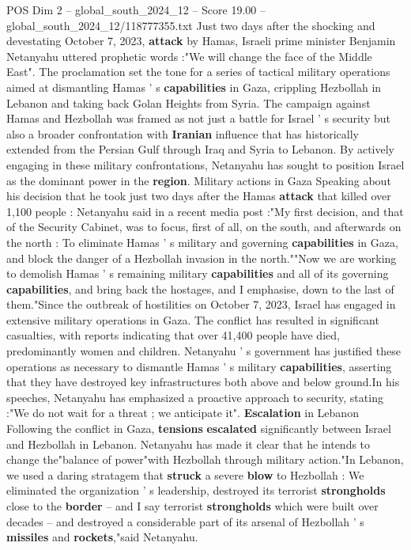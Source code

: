 \begin{textsample}{POS Dim 2 – global\_south\_2024\_12 – Score 19.00 – global\_south\_2024\_12/118777355.txt}  \label{ex:f2_pos_208}
Just two days after the shocking and devestating October 7, 2023, \textbf{attack} by Hamas, Israeli prime minister Benjamin Netanyahu uttered prophetic words :"We will change the face of the Middle East".
The proclamation set the tone for a series of tactical military operations aimed at dismantling Hamas ' s \textbf{capabilities} in Gaza, crippling Hezbollah in Lebanon and taking back Golan Heights from Syria.
The campaign against Hamas and Hezbollah was framed as not just a battle for Israel ' s security but also a broader confrontation with \textbf{Iranian} influence that has historically extended from the Persian Gulf through Iraq and Syria to Lebanon.
By actively engaging in these military confrontations, Netanyahu has sought to position Israel as the dominant power in the \textbf{region}.
Military actions in Gaza Speaking about his decision that he took just two days after the Hamas \textbf{attack} that killed over 1,100 people : Netanyahu said in a recent media post :"My first decision, and that of the Security Cabinet, was to focus, first of all, on the south, and afterwards on the north : To eliminate Hamas ' s military and governing \textbf{capabilities} in Gaza, and block the danger of a Hezbollah invasion in the north.""Now we are working to demolish Hamas ' s remaining military \textbf{capabilities} and all of its governing \textbf{capabilities}, and bring back the hostages, and I emphasise, down to the last of them."Since the outbreak of hostilities on October 7, 2023, Israel has engaged in extensive military operations in Gaza.
The conflict has resulted in significant casualties, with reports indicating that over 41,400 people have died, predominantly women and children.
Netanyahu ' s government has justified these operations as necessary to dismantle Hamas ' s military \textbf{capabilities}, asserting that they have destroyed key infrastructures both above and below ground.In his speeches, Netanyahu has emphasized a proactive approach to security, stating :"We do not wait for a threat ; we anticipate it". \textbf{Escalation} in Lebanon Following the conflict in Gaza, \textbf{tensions} \textbf{escalated} significantly between Israel and Hezbollah in Lebanon.
Netanyahu has made it clear that he intends to change the"balance of power"with Hezbollah through military action."In Lebanon, we used a daring stratagem that \textbf{struck} a severe \textbf{blow} to Hezbollah : We eliminated the organization ' s leadership, destroyed its terrorist \textbf{strongholds} close to the \textbf{border} -- and I say terrorist \textbf{strongholds} which were built over decades -- and destroyed a considerable part of its arsenal of Hezbollah ' s \textbf{missiles} and \textbf{rockets},"said Netanyahu.

\end{textsample}
